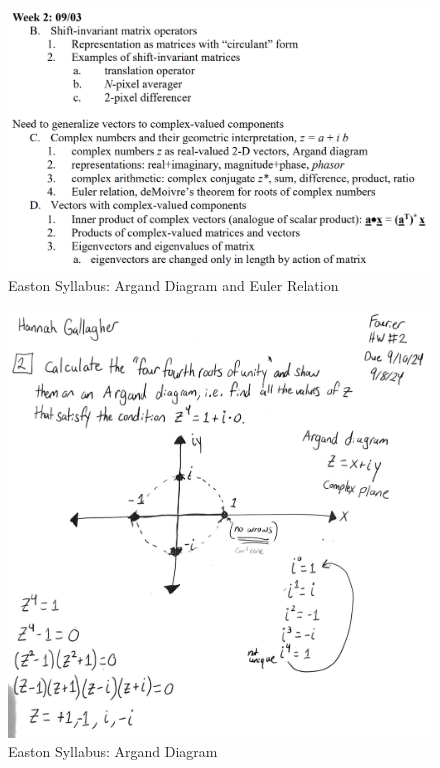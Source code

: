 \documentclass{article}
\begin{document}
\begin{figure}[h!]
\centering
\includegraphics[scale=.65]{Fourier/Week 2/Week2.1.png}
\caption{Easton Syllabus: Argand Diagram and Euler Relation}
\label{fig:Snowman}
\end{figure}

\begin{figure}[h!]
\centering
\includegraphics[scale=.4]{Fourier/Week 2/HW/Argand_Roots_of_unity.png}
\caption{Easton Syllabus: Argand Diagram}
\label{fig:Snowman}
\end{figure}
\end{document}
